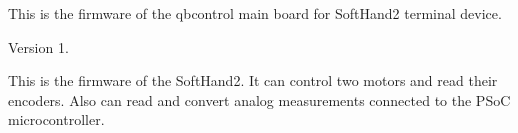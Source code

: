 This is the firmware of the qbcontrol main board for Soft\+Hand2 terminal device. \begin{DoxyVersion}{Version}
1.
\end{DoxyVersion}
This is the firmware of the Soft\+Hand2. It can control two motors and read their encoders. Also can read and convert analog measurements connected to the P\+SoC microcontroller. 